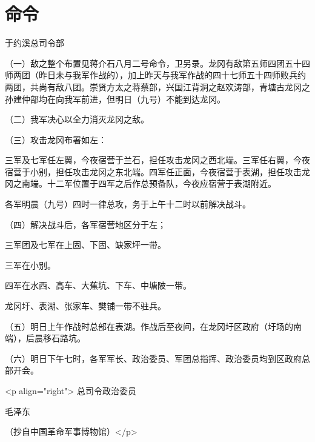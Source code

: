 \section[命令（一九三三年八月八日）]{命令}


于约溪总司令部

（一）敌之整个布置见蒋介石八月二号命令，卫另录。龙冈有敌第五师四团五十四师两团（昨日未与我军作战的），加上昨天与我军作战的四十七师五十四师败兵约两团，共尚有敌八团。崇贤方太之蒋蔡部，兴国江背洞之赵欢涛部，青塘古龙冈之孙建仲部均在向我军前进，但明日（九号）不能到达龙冈。

（二）我军决心以全力消灭龙冈之敌。

（三）攻击龙冈布署如左：


三军及七军任左翼，今夜宿营于兰石，担任攻击龙冈之西北端。三军任右翼，今夜宿营于小别，担任攻击龙冈之东北端。四军任正面，今夜宿营于表湖，担任攻击龙冈之南端。十二军位置于四军之后作总预备队，今夜应宿营于表湖附近。

各军明晨（九号）四时一律总攻，务于上午十二时以前解决战斗。

（四）解决战斗后，各军宿营地区分于左；

三军团及七军在上固、下固、缺家坪一带。

三军在小别。

四军在水西、高车、大蕉坑、下车、中塘陂一带。

龙冈圩、表湖、张家车、樊铺一带不驻兵。

（五）明日上午作战时总部在表湖。作战后至夜间，在龙冈圩区政府（圩场的南端），后晨移石路坑。

（六）明日下午七时，各军军长、政治委员、军团总指挥、政治委员均到区政府总部开会。

<p align="right"> 总司令政治委员

 毛泽东

（抄自中国革命军事博物馆）</p>

